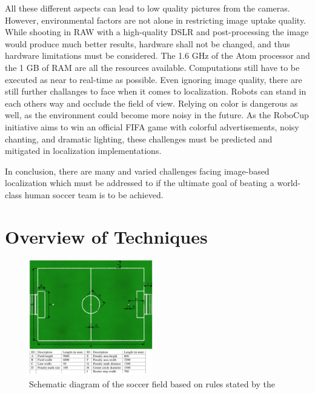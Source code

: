 \documentclass[12pt, a4paper, doc]{apa6}
\begin{document}
  All these different aspects can lead to low quality pictures from the cameras. However, environmental factors are not alone in restricting image uptake quality. While shooting in RAW with a high-quality DSLR and post-processing the image would produce much better results, hardware shall not be changed, and thus hardware limitations must be considered. The 1.6 GHz of the Atom processor and the 1 GB of RAM are all the resources available. Computations still have to be executed as near to real-time as possible. Even ignoring image quality, there are still further challanges to face when it comes to localization. Robots can stand in each others way and occlude the field of view. Relying on color is dangerous as well, as the environment could become more noisy in the future. As the RoboCup initiative aims to win an official FIFA game with colorful advertisements, noisy chanting, and dramatic lighting, these challenges must be predicted and mitigated in localization implementations.

  In conclusion, there are many and varied challenges facing image-based localization which must be addressed to if the ultimate goal of beating a world-class human soccer team is to be achieved.

  \newpage

  \section{Overview of Techniques}

  \begin{figure}
    \begin{center}
      \includegraphics[width=0.48\textwidth]{field.png}
    \end{center}
    \caption{Schematic diagram of the soccer field based on rules stated by the \cite{soccerfield}}
    \label{field}
  \end{figure}
\end{document}
